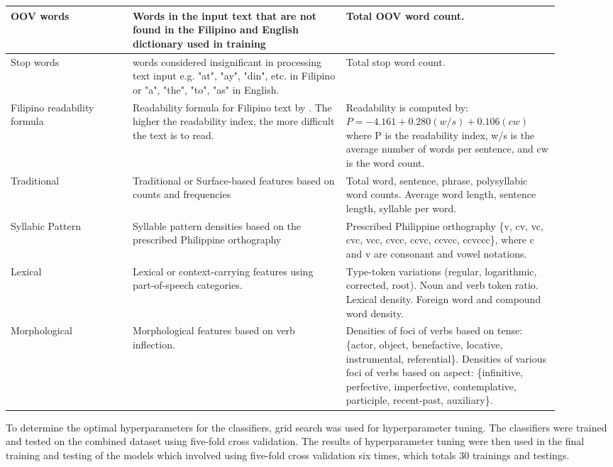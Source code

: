 \begin{xtabular}{|p{0.20\linewidth}|p{0.35\linewidth}|p{0.35\linewidth}|}
      OOV words & Words in the input text that are not found in the Filipino and English dictionary used in training & Total OOV word count. \\
      \hline
      Stop words & words considered insignificant in processing text input e.g. "at", "ay", "din", etc. in Filipino or "a", "the", "to", "as" in English. & Total stop word count. \\
      \hline
      Filipino readability formula & Readability formula for Filipino text by . The higher the readability index, the more difficult the text is to read. & Readability is computed by: \( P = -4.161 + 0.280(w/s) + 0.106(cw)\) where P is the readability index, w/s is the average number of words per sentence, and cw is the word count. \\
      \hline
      Traditional & Traditional or Surface-based features based on counts and frequencies & Total word, sentence, phrase, polysyllabic word counts. Average word length, sentence length, syllable per word. \\
      \hline
      Syllabic Pattern & Syllable pattern densities based on the prescribed Philippine orthography & Prescribed Philippine orthography \{v, cv, vc, cvc, vcc, cvcc, ccvc, ccvcc, ccvccc\}, where c and v are consonant and vowel notations. \\
      \hline
      Lexical & Lexical or context-carrying features using part-of-speech categories. & Type-token variations (regular, logarithmic, corrected, root). Noun and verb token ratio. Lexical density. Foreign word and compound word density.\\
      \hline
      Morphological & Morphological features based on verb inflection. & Densities of foci of verbs based on tense: \{actor, object, benefactive, locative, instrumental, referential\}. Densities of various foci of verbs based on aspect: \{infinitive, perfective, imperfective, contemplative, participle, recent-past, auxiliary\}.
    \end{xtabular}
\endgroup
\doublespacing
\clearpage

To determine the optimal hyperparameters for the classifiers, grid search was used for hyperparameter tuning. The classifiers were trained and tested on the combined dataset using five-fold cross validation. The results of hyperparameter tuning were then used in the final training and testing of the models which involved using five-fold cross validation six times, which totals 30 trainings and testings.

